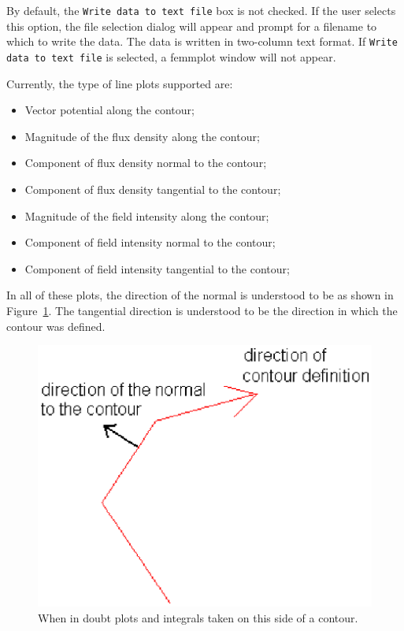 \documentclass[12pt]{report}
\begin{document}
By default, the {\tt Write data to text file} box is not checked.
If the user selects this option, the file selection dialog will
appear and prompt for a filename to which to write the data. The
data is written in two-column text format.  If {\tt Write data to
text file} is selected, a femmplot window will not appear.

Currently, the type of line plots supported are:
\begin{itemize}
\item Vector potential along the contour;
\item Magnitude of the flux density along the contour;
\item Component of flux density normal to the contour;
\item Component of flux density tangential to the contour;
\item Magnitude of the field intensity along the contour;
\item Component of field intensity normal to the contour;
\item Component of field intensity tangential to the contour;
\end{itemize}

In all of these plots, the direction of the normal is understood to
be as shown in Figure~\ref{this_side}.  The tangential direction is
understood to be the direction in which the contour was defined.
\begin{figure}[ht]
\centerline{\includegraphics{thisside.ps}}
\caption{When in doubt plots and integrals taken on this side of a contour.}
\label{this_side}
\end{figure}
\end{document}

